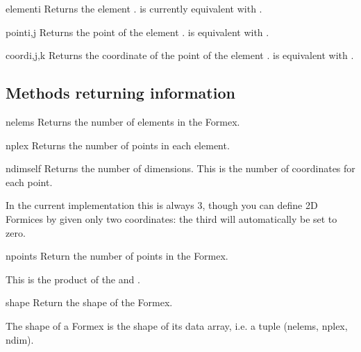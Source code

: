 {{\begin{methoddesc}{element}{i}
Returns the element .  is currently equivalent with .
\end{methoddesc}

\begin{methoddesc}{point}{i,j}
Returns the point  of the element .  is equivalent with .
\end{methoddesc}

\begin{methoddesc}{coord}{i,j,k}
Returns the coordinate  of the point  of the element .  is equivalent with .
\end{methoddesc}


\subsection{Methods returning information}

\begin{methoddesc}{nelems}{}
Returns the number of elements in the Formex.
\end{methoddesc}

\begin{methoddesc}{nplex}{}
Returns the number of points in each element.
\end{methoddesc}
    
\begin{methoddesc}{ndim}{self}
Returns the number of dimensions. This is the number of coordinates for each point. 

In the current implementation this is always 3, though you can define 2D Formices by given only two coordinates: the third will automatically be set to zero.
\end{methoddesc}

\begin{methoddesc}{npoints}{}
Return the number of points in the Formex.

This is the product of the  and  .
\end{methoddesc}
    
\begin{methoddesc}{shape}{}
Return the shape of the Formex.

The shape of a Formex is the shape of its data array,
i.e. a tuple (nelems, nplex, ndim).
\end{methoddesc}

}}
